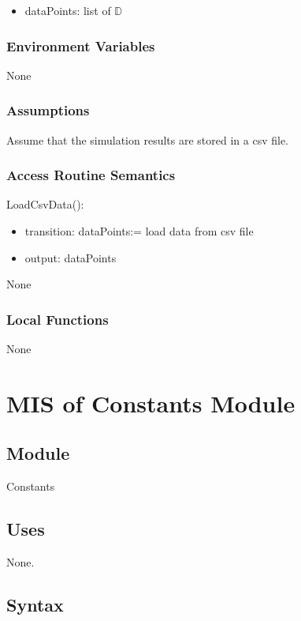 \documentclass[12pt, titlepage]{article}
\begin{document}
\begin{itemize}
  \item dataPoints: list of $\mathbb{D}$ 
\end{itemize}

\subsubsection{Environment Variables}
None

\subsubsection{Assumptions}

Assume that the simulation results are stored in a csv file.

\subsubsection{Access Routine Semantics}

\noindent LoadCsvData():
\begin{itemize}
\item transition: dataPoints:= load data from csv file
\item output: dataPoints
\end{itemize}

None

\subsubsection{Local Functions}

None

\newpage

\section{MIS of Constants Module} \label{Module_constants} 
\subsection{Module}

Constants

\subsection{Uses}
None.

\subsection{Syntax}
\end{document}
